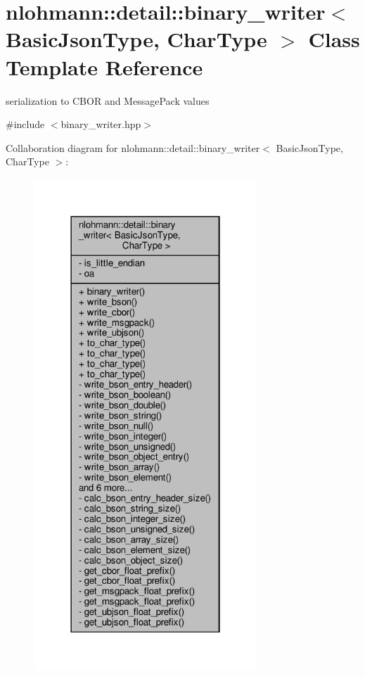 \hypertarget{classnlohmann_1_1detail_1_1binary__writer}{}\section{nlohmann\+:\+:detail\+:\+:binary\+\_\+writer$<$ Basic\+Json\+Type, Char\+Type $>$ Class Template Reference}
\label{classnlohmann_1_1detail_1_1binary__writer}


serialization to C\+B\+OR and Message\+Pack values  




{\ttfamily \#include $<$binary\+\_\+writer.\+hpp$>$}



Collaboration diagram for nlohmann\+:\+:detail\+:\+:binary\+\_\+writer$<$ Basic\+Json\+Type, Char\+Type $>$\+:\nopagebreak
\begin{figure}[H]
\begin{center}
\leavevmode
\includegraphics[width=238pt]{classnlohmann_1_1detail_1_1binary__writer__coll__graph}
\end{center}
\end{figure}
